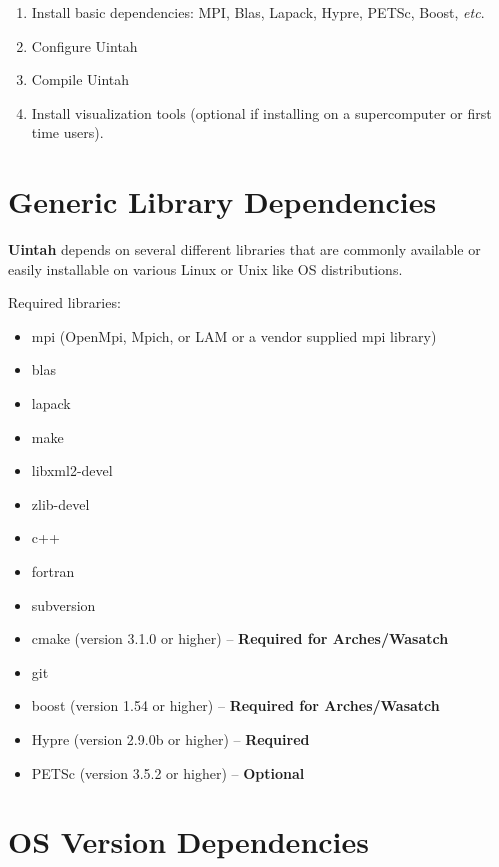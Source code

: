 \documentclass[12pt]{article}
\begin{document}
\begin{enumerate}

\item Install basic dependencies: MPI, Blas, Lapack, Hypre, PETSc,
  Boost, \emph{etc}.

\item Configure Uintah

\item Compile Uintah

\item Install visualization tools (optional if installing on a
  supercomputer or first time users).


\end{enumerate}



\section{Generic Library Dependencies}

\textbf{Uintah} depends on several different libraries that are
commonly available or easily installable on various Linux or Unix like
OS distributions.

Required libraries:
\begin{itemize}
\item mpi (OpenMpi, Mpich, or LAM or a vendor supplied mpi library)
\item blas
\item lapack
\item make
\item libxml2-devel
\item zlib-devel
\item c++
\item fortran
\item subversion
\item cmake (version 3.1.0 or higher) -- \textbf{Required for Arches/Wasatch}
\item git
\item boost (version 1.54 or higher) -- \textbf{Required for Arches/Wasatch}
\item Hypre (version 2.9.0b or higher) -- \textbf{Required}
\item PETSc (version 3.5.2 or higher) -- \textbf{Optional}
\end{itemize}


\section{OS Version Dependencies}
\label{sec:dependencies}
\end{document}
